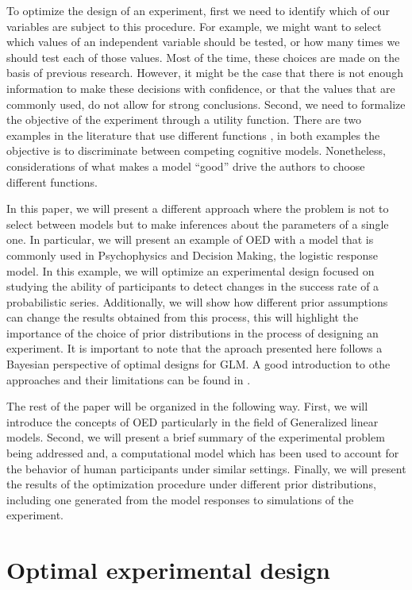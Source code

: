 \documentclass[preprint,review,12pt]{elsarticle}
\begin{document}
To optimize the design of an experiment, first we need to identify which of our variables are subject to this procedure. For example, we might want to select which values of an independent variable should be tested, or how many times we should test each of those values. Most of the time, these choices are made on the basis of previous research. However, it might be the case that there is not enough information to make these decisions with confidence, or that the values that are commonly used, do not allow for strong conclusions. Second, we need to formalize the objective of the experiment through a utility function. There are two examples in the literature that use different functions \citep[][e.g.]{Myung2009,ZL2010}, in both examples the objective is to discriminate between competing cognitive models. Nonetheless, considerations of what makes a model ``good'' drive the authors to choose different functions. 

In this paper, we will present a different approach where the problem is not to select between models but to make inferences about the parameters of a single one. In particular, we will present an example of OED with a model that is commonly used in Psychophysics and Decision Making, the logistic response model. %
In this example, we will optimize an experimental design focused on studying the ability of participants to detect changes in the success rate of a probabilistic series. Additionally, we will show how different prior assumptions can change the results obtained from this process, this will highlight the importance of the choice of prior distributions in the process of designing an experiment. It is important to note that the aproach presented here follows a Bayesian perspective of optimal designs for GLM. A good introduction to othe approaches and their limitations can be found in \citet{khurietal2006}.

The rest of the paper will be organized in the following way. First, we will introduce the concepts of OED particularly in the field of Generalized linear models. Second, we will present a brief summary of the experimental problem being addressed and, a computational model which has been used to account for the behavior of human participants under similar settings. Finally, we will present the results of the optimization procedure under different prior distributions, including one generated from the model responses to simulations of the experiment.

\section{Optimal experimental design}
\end{document}
